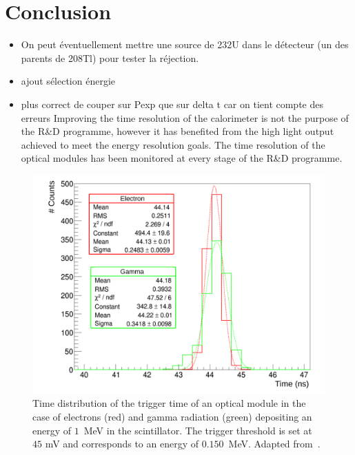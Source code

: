 \section{Conclusion}

\begin{itemize}
\item On peut éventuellement mettre une source de 232U dans le détecteur (un des parents de 208Tl) pour tester la réjection.
\item ajout sélection énergie
\item plus correct de couper sur Pexp que sur delta t car on tient compte des erreurs
Improving the time resolution of the calorimeter is not the purpose of the R\&D programme, however it has benefited from the high light output achieved to meet the energy resolution goals.
The time resolution of the optical modules has been monitored at every stage of the R\&D programme.

\end{itemize}


\begin{figure}[!h]
  \centering
  \includegraphics[width=13cm]{timedifference/fig_timediff/Arnaud_RMS_PM.pdf}
  \caption{Time distribution of the trigger time of an optical module in the case of electrons (red) and gamma radiation (green) depositing an energy of $1$~MeV in the scintillator.
    The trigger threshold is set at $45$ mV and corresponds to an energy of $0.150$~MeV.
    Adapted from~\cite{HuberThesis}.
  \label{fig:Arnaud_RMS_PM}}
\end{figure}
